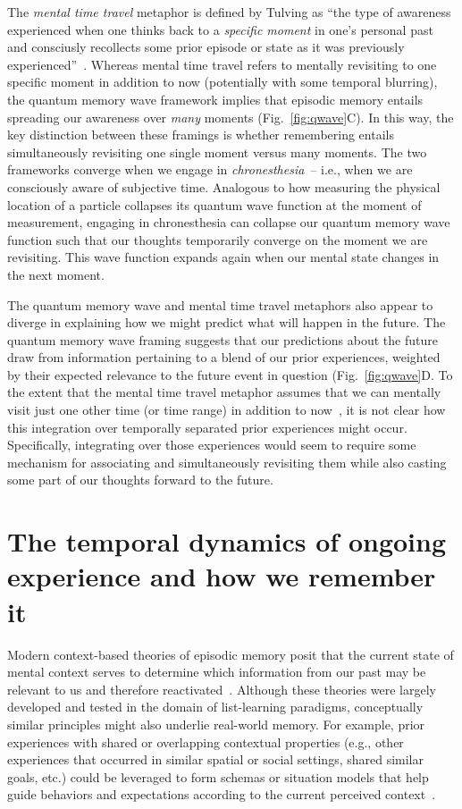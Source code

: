 \documentclass{article}
\begin{document}
The \textit{mental time travel} metaphor is defined by Tulving as ``the type of awareness experienced when one thinks back to a \textit{specific moment} in one's personal past and consciusly recollects some prior episode or state as it was previously experienced''~\citep[Fig.~\ref{fig:qwave}B][emphasis added]{WheeEtal97}.  Whereas mental time travel refers to mentally revisiting to one specific moment in addition to now (potentially with some temporal blurring), the quantum memory wave framework implies that episodic memory entails spreading our awareness over \textit{many} moments (Fig.~\ref{fig:qwave}C).  In this way, the key distinction between these framings is whether remembering entails simultaneously revisiting one single moment versus many moments.  The two frameworks converge when we engage in \textit{chronesthesia}~\citep{Tulv02b}-- i.e., when we are consciously aware of subjective time.   Analogous to how measuring the physical location of a particle collapses its quantum wave function at the moment of measurement, engaging in chronesthesia can collapse our quantum memory wave function such that our thoughts temporarily converge on the moment we are revisiting.  This wave function expands again when our mental state changes in the next moment.

The quantum memory wave and mental time travel metaphors also appear to diverge in explaining how we might predict what will happen in the future.  The quantum memory wave framing suggests that our predictions about the future draw from information pertaining to a blend of our prior experiences, weighted by their expected relevance to the future event in question (Fig.~\ref{fig:qwave}D.  To the extent that the mental time travel metaphor assumes that we can mentally visit just one other time (or time range) in addition to now~\citep[e.g.,][]{SzpuTulv11}, it is not clear how this integration over temporally separated prior experiences might occur.  Specifically, integrating over those experiences would seem to require some mechanism for associating and simultaneously revisiting them while also casting some part of our thoughts forward to the future.


\section*{The temporal dynamics of ongoing experience and how we remember it}
Modern context-based theories of episodic memory posit that the current state of mental context serves to determine which information from our past may be relevant to us and therefore reactivated~\citep[e.g., ][]{PolyEtal09}. Although these theories were largely developed and tested in the domain of list-learning paradigms, conceptually similar principles might also underlie real-world memory.  For example, prior experiences with shared or overlapping contextual properties (e.g., other experiences that occurred in similar spatial or social settings, shared similar goals, etc.) could be leveraged to form schemas or situation models that help guide behaviors and expectations according to the current perceived context~\citep{RangRitc12, BaldEtal18, AlyEtal18}.
\end{document}
